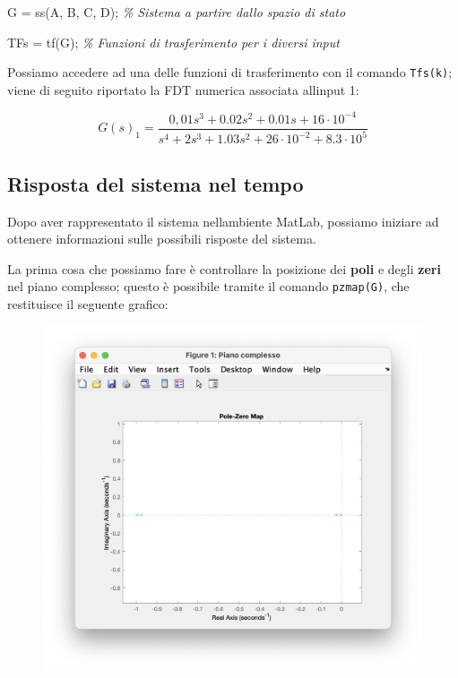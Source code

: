 \documentclass[
]{article}
\newenvironment{Shaded}{}{}
\newcommand{\CommentTok}[1]{\textcolor[rgb]{0.38,0.63,0.69}{\textit{#1}}}
\newcommand{\NormalTok}[1]{#1}
\newcommand{\OperatorTok}[1]{\textcolor[rgb]{0.40,0.40,0.40}{#1}}
\newcommand{\VariableTok}[1]{\textcolor[rgb]{0.10,0.09,0.49}{#1}}
\begin{document}
\begin{Shaded}
\begin{Highlighting}[]
\VariableTok{G} \OperatorTok{=} \VariableTok{ss}\NormalTok{(}\VariableTok{A}\OperatorTok{,} \VariableTok{B}\OperatorTok{,} \VariableTok{C}\OperatorTok{,} \VariableTok{D}\NormalTok{)}\OperatorTok{;}         \CommentTok{\% Sistema a partire dallo spazio di stato              }

\VariableTok{TFs} \OperatorTok{=} \VariableTok{tf}\NormalTok{(}\VariableTok{G}\NormalTok{)}\OperatorTok{;}                \CommentTok{\% Funzioni di trasferimento per i diversi input}
\end{Highlighting}
\end{Shaded}

Possiamo accedere ad una delle funzioni di trasferimento con il comando
\texttt{Tfs(k)}; viene di seguito riportato la FDT numerica associata
all\textquotesingle input 1:

\[G(s)_{1} = \frac{0,01s^3+0.02s^2+0.01s+16\cdot 10^{-4}}{s^4 + 2s^3 +1.03s^2+26\cdot10^{-2}+8.3\cdot10^{5}}\]

\newpage

\hypertarget{risposta-del-sistema-nel-tempo}{%
\subsection{Risposta del sistema nel
tempo}\label{risposta-del-sistema-nel-tempo}}

Dopo aver rappresentato il sistema nell\textquotesingle ambiente MatLab,
possiamo iniziare ad ottenere informazioni sulle possibili risposte del
sistema.

La prima cosa che possiamo fare è controllare la posizione dei
\textbf{poli} e degli \textbf{zeri} nel piano complesso; questo è
possibile tramite il comando \texttt{pzmap(G)}, che restituisce il
seguente grafico:

\begin{figure}
    \centering
    \includegraphics[width=0.8\linewidth]{images/image-20240106112015562.png}
    
    
\end{figure}
\end{document}
